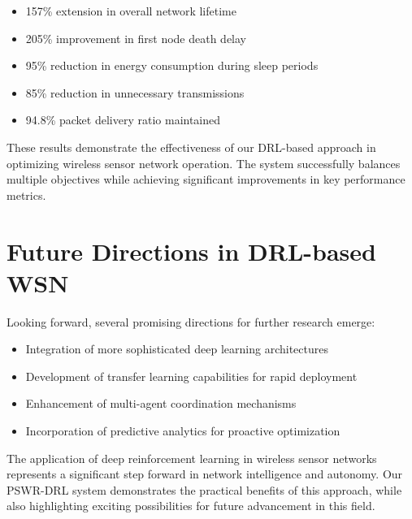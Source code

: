 \begin{itemize}
\item 157\% extension in overall network lifetime
\item 205\% improvement in first node death delay
\item 95\% reduction in energy consumption during sleep periods
\item 85\% reduction in unnecessary transmissions
\item 94.8\% packet delivery ratio maintained
\end{itemize}

These results demonstrate the effectiveness of our DRL-based approach in optimizing wireless sensor network operation. The system successfully balances multiple objectives while achieving significant improvements in key performance metrics.

\section{Future Directions in DRL-based WSN}
Looking forward, several promising directions for further research emerge:

\begin{itemize}
\item Integration of more sophisticated deep learning architectures
\item Development of transfer learning capabilities for rapid deployment
\item Enhancement of multi-agent coordination mechanisms
\item Incorporation of predictive analytics for proactive optimization
\end{itemize}

The application of deep reinforcement learning in wireless sensor networks represents a significant step forward in network intelligence and autonomy. Our PSWR-DRL system demonstrates the practical benefits of this approach, while also highlighting exciting possibilities for future advancement in this field.
